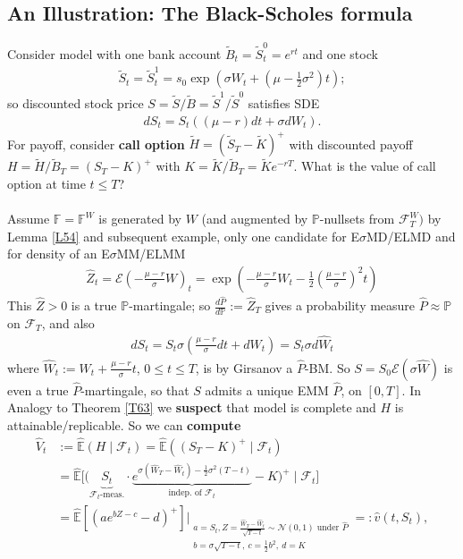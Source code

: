 \documentclass[12pt,a4paper, twoside]{article}
\theoremstyle{definition}
\newcommand{\EE}{\mathbb{E}} %
\newcommand{\PP}{\mathbb{P}} %
\begin{document}
\subsection{An Illustration: The Black-Scholes formula}
Consider model with one bank account $\widetilde{B}_t = \widetilde{S}_t^0 = e^{rt}$ and one stock 
\begin{align*}
\widetilde{S}_t = \widetilde{S}_t^1 = s_0 \exp \left( \sigma W_t + \left( \mu - \frac{1}{2}\sigma^2 \right)t\right);
\end{align*}
so discounted stock price $S= \widetilde{S}/ \widetilde{B}= \widetilde{S}^1/ \widetilde{S}^0$ satisfies SDE
\begin{align*}
dS_t = S_t(( \mu-r) dt + \sigma dW_t). 
\end{align*}
For payoff, consider \textbf{call option} $\widetilde{H}=( \widetilde{S}_T-\widetilde{K})^+$ with discounted payoff $H=\widetilde{H}/ \widetilde{B}_T=(S_T-K)^+$ with $K= \widetilde{K}/\widetilde{B}_T= \widetilde{K}e^{-rT}$. What is the value of call option at time $t \leq T$?\\
\\
Assume $\mathbb{F}= \mathbb{F}^W$ is generated by $W$ (and augmented by $\PP$-nullsets from $\mathcal{F}_T^W)$ by Lemma \ref{L54} and subsequent example, only one candidate for E$\sigma$MD/ELMD and for density of an E$\sigma$MM/ELMM 
\begin{align*}
\widehat{Z}_t = \mathcal{E} \left(- \frac{\mu-r}{\sigma} W\right)_t = \exp \left( - \frac{\mu-r}{\sigma}W_t - \frac{1}{2} \left( \frac{\mu-r}{\sigma}\right)^2t \right)
\end{align*}
\newpage
This $\widehat{Z}>0$ is a true $\PP$-martingale; so $\frac{d\widehat{P}}{d\PP}:= \widehat{Z}_T$ gives a probability measure $\widehat{P} \approx \PP$ on $\mathcal{F}_T$, and also 
\begin{align*}
dS_t = S_t \sigma \left( \frac{\mu-r}{\sigma}dt + dW_t \right) = S_t \sigma d \widehat{W}_t
\end{align*}
where $\widehat{W}_t := W_t + \frac{\mu-r}{\sigma}t$, $0 \leq t \leq T$, is by Girsanov a $\widehat{P}$-BM. So $S= S_0 \mathcal{E}( \sigma \widehat{W})$ is even a true $\widehat{P}$-martingale, so that $S$ admits a unique EMM $\widehat{P}$, on $[0,T]$. In Analogy to Theorem \ref{T63} we \textbf{suspect} that model is complete and $H$ is attainable/replicable. So we can \textbf{compute}
\begin{align*}
\widehat{V}_t&:= \widehat{\EE}(H \mid \mathcal{F}_t) = \widehat{\EE}((S_T-K)^+ \mid \mathcal{F}_t) \\
&= \widehat{\EE}  \Big[  \Big( \underbrace{S_t}_{ \mathcal{F}_t\text{-meas.}} \cdot \underbrace{e^{ \sigma ( \widehat{W}_T-\widehat{W}_t) - \frac{1}{2} \sigma^2(T-t)}}_{\text{indep. of } \mathcal{F}_t}-K \Big)^+ \mid \mathcal{F}_t \Big] \\
& = \widehat{\EE} \left[ \left( ae^{bZ-c}-d \right)^+\right] \Big|_{\substack{ a = S_t, Z =\frac{\widehat{W}_T- \widehat{W}_t}{\sqrt{T-t}} \sim \mathcal{N}(0,1) \text{ under } \widehat{P} \\ b= \sigma \sqrt{T-t}, \ c = \frac{1}{2}b^2, \ d =K}} =: \widehat{v}(t,S_t),
\end{align*}
\end{document}
